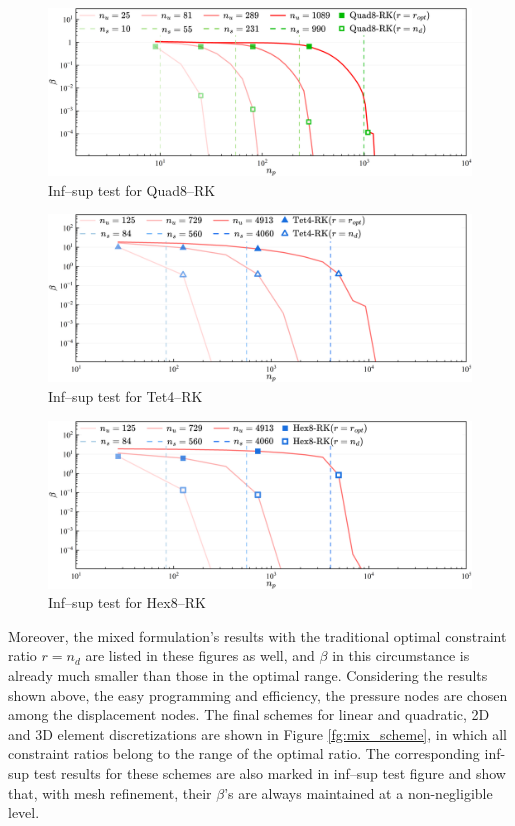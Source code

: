 \begin{figure}[H]
\centering
\includegraphics[width=\textwidth]{png/quad8.png}\caption{Inf--sup test for Quad8--RK}\label{fg:infsup_convergence_2D_d}
\end{figure}

\begin{figure}[H]
\centering
\includegraphics[width=\textwidth]{png/Tet4.png}\caption{Inf--sup test for Tet4--RK}\label{fg:infsup_convergence_3D_a}
\end{figure}

\begin{figure}[H]
\centering
\includegraphics[width=\textwidth]{png/Hex8.png}\caption{Inf--sup test for Hex8--RK}\label{fg:infsup_convergence_3D_b}
\end{figure}

Moreover, the mixed formulation's results with the traditional optimal constraint ratio $r=n_d$ are listed in these figures as well, and $\beta$ in this circumstance is already much smaller than those in the optimal range. Considering the results shown above, the easy programming and efficiency, the pressure nodes are chosen among the displacement nodes. The final schemes for linear and quadratic, 2D and 3D element discretizations are shown in Figure \ref{fg:mix_scheme}, in which all constraint ratios belong to the range of the optimal ratio. The corresponding inf-sup test results for these schemes are also marked in inf--sup test figure and show that, with mesh refinement, their $\beta$'s are always maintained at a non-negligible level.

